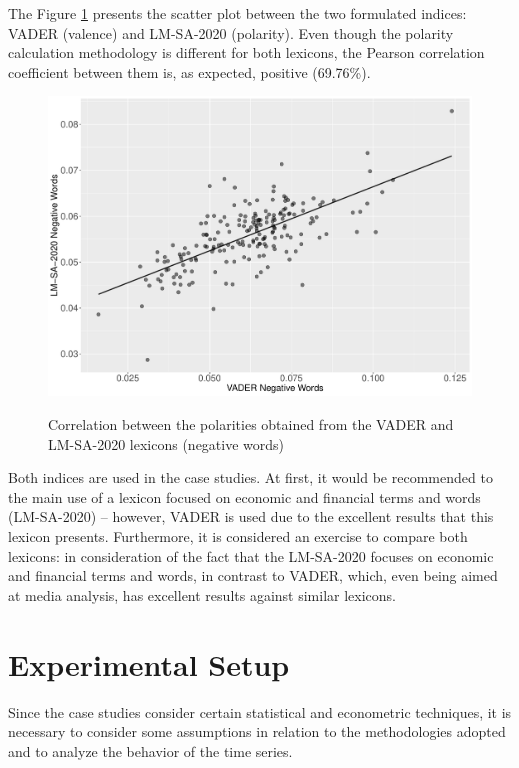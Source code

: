The Figure \ref{fig:correlationvaderlmsa} presents the scatter plot between the two formulated indices: VADER (valence) and LM-SA-2020 (polarity). Even though the polarity calculation methodology is different for both lexicons, the Pearson correlation coefficient between them is, as expected, positive (69.76\%).

\begin{figure}[!h]
    \centering
    \caption{Correlation between the polarities obtained from the VADER and LM-SA-2020 lexicons (negative words)}
    \includegraphics[width=.7\textwidth]{images/correlation_vader_lm.pdf}
    \label{fig:correlationvaderlmsa}
\end{figure}

Both indices are used in the case studies. At first, it would be recommended to \cite[p. 62]{loughran2011liability} the main use of a lexicon focused on economic and financial terms and words (LM-SA-2020) -- however, VADER is used due to the excellent results that this lexicon presents. Furthermore, it is considered an exercise to compare both lexicons: in consideration of the fact that the LM-SA-2020 focuses on economic and financial terms and words, in contrast to VADER, which, even being aimed at media analysis, has excellent results against similar lexicons.

\section{Experimental Setup}

Since the case studies consider certain statistical and econometric techniques, it is necessary to consider some assumptions in relation to the methodologies adopted and to analyze the behavior of the time series.\\

